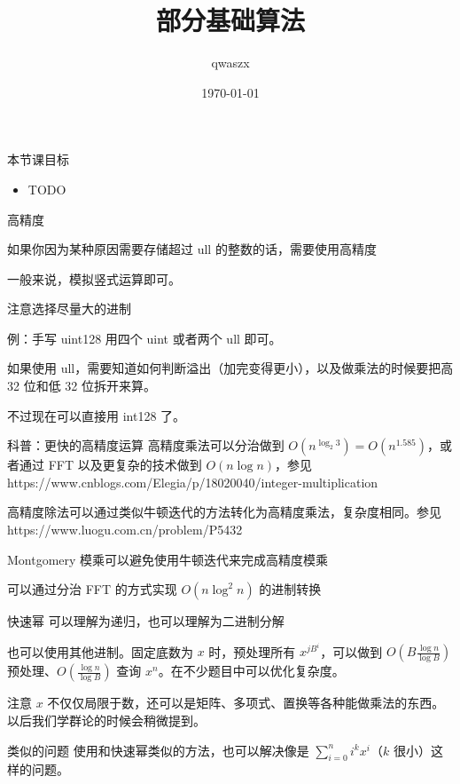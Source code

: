\documentclass[11pt,aspectratio=169]{beamer}
\title{部分基础算法}
\author{qwaszx}
\date{\today}
\begin{document}
\begin{frame}
  \titlepage
\end{frame}

\begin{frame}{本节课目标}
\begin{itemize}
    \item TODO
\end{itemize}

\end{frame}

\begin{frame}{高精度}

如果你因为某种原因需要存储超过 ull 的整数的话，需要使用高精度

一般来说，模拟竖式运算即可。

注意选择尽量大的进制

\end{frame}
\begin{frame}{例：手写 uint128}
    用四个 uint 或者两个 ull 即可。

    如果使用 ull，需要知道如何判断溢出（加完变得更小），以及做乘法的时候要把高 32 位和低 32 位拆开来算。

    不过现在可以直接用 int128 了。
\end{frame}

\begin{frame}{科普：更快的高精度运算}
    高精度乘法可以分治做到 $O(n^{\log_2 3})=O(n^{1.585})$，或者通过 FFT 以及更复杂的技术做到 $O(n\log n)$，参见 https://www.cnblogs.com/Elegia/p/18020040/integer-multiplication

    高精度除法可以通过类似牛顿迭代的方法转化为高精度乘法，复杂度相同。参见 https://www.luogu.com.cn/problem/P5432

    Montgomery 模乘可以避免使用牛顿迭代来完成高精度模乘

    可以通过分治 FFT 的方式实现 $O(n\log^2 n)$ 的进制转换
\end{frame}

\begin{frame}{快速幂}
    可以理解为递归，也可以理解为二进制分解

    也可以使用其他进制。固定底数为 $x$ 时，预处理所有 $x^{jB^i}$，可以做到 $O(B\frac{\log n}{\log B})$ 预处理、$O(\frac{\log n}{\log B})$ 查询 $x^n$。在不少题目中可以优化复杂度。

    注意 $x$ 不仅仅局限于数，还可以是矩阵、多项式、置换等各种能做乘法的东西。以后我们学群论的时候会稍微提到。
\end{frame}
\begin{frame}{类似的问题}
    使用和快速幂类似的方法，也可以解决像是 $\sum_{i=0}^n i^kx^i$（$k$ 很小）这样的问题。
\end{frame}
\end{document}

